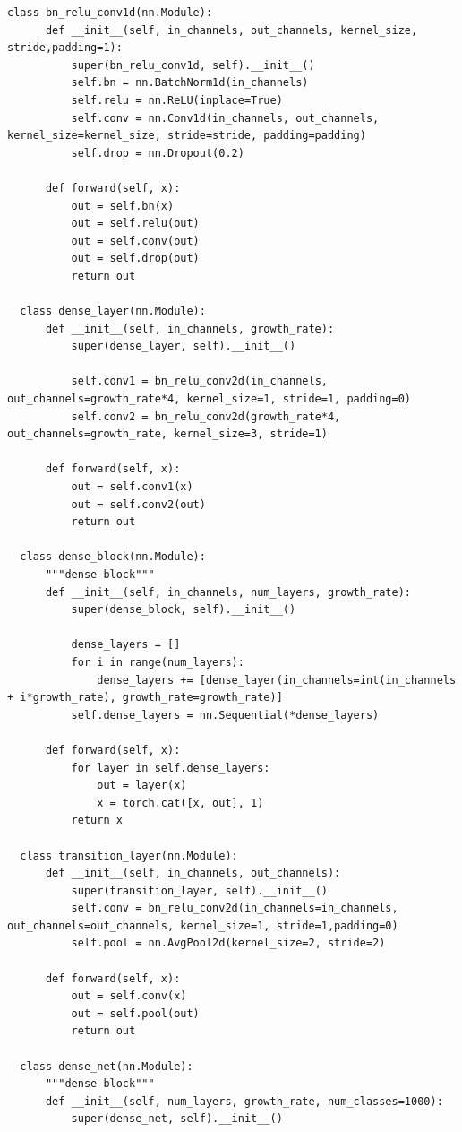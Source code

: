 \documentclass[a4paper,11pt,dvipdfmx]{jreport}
\begin{document}
\begin{lstlisting}[caption=印象判定用NN{,} DenseNetに関するソースコード, label=source]
  class bn_relu_conv1d(nn.Module):
      def __init__(self, in_channels, out_channels, kernel_size, stride,padding=1):
          super(bn_relu_conv1d, self).__init__()
          self.bn = nn.BatchNorm1d(in_channels)
          self.relu = nn.ReLU(inplace=True)
          self.conv = nn.Conv1d(in_channels, out_channels, kernel_size=kernel_size, stride=stride, padding=padding)
          self.drop = nn.Dropout(0.2)
  
      def forward(self, x):
          out = self.bn(x)
          out = self.relu(out)
          out = self.conv(out)
          out = self.drop(out)
          return out
  
  class dense_layer(nn.Module):
      def __init__(self, in_channels, growth_rate):
          super(dense_layer, self).__init__()
  
          self.conv1 = bn_relu_conv2d(in_channels, out_channels=growth_rate*4, kernel_size=1, stride=1, padding=0)
          self.conv2 = bn_relu_conv2d(growth_rate*4, out_channels=growth_rate, kernel_size=3, stride=1)
  
      def forward(self, x):
          out = self.conv1(x)
          out = self.conv2(out)
          return out
  
  class dense_block(nn.Module):
      """dense block"""
      def __init__(self, in_channels, num_layers, growth_rate):
          super(dense_block, self).__init__()
  
          dense_layers = []
          for i in range(num_layers):
              dense_layers += [dense_layer(in_channels=int(in_channels + i*growth_rate), growth_rate=growth_rate)]
          self.dense_layers = nn.Sequential(*dense_layers)
  
      def forward(self, x):
          for layer in self.dense_layers:
              out = layer(x)
              x = torch.cat([x, out], 1)
          return x
  
  class transition_layer(nn.Module):
      def __init__(self, in_channels, out_channels):
          super(transition_layer, self).__init__()
          self.conv = bn_relu_conv2d(in_channels=in_channels, out_channels=out_channels, kernel_size=1, stride=1,padding=0)
          self.pool = nn.AvgPool2d(kernel_size=2, stride=2)
  
      def forward(self, x):
          out = self.conv(x)
          out = self.pool(out)
          return out
  
  class dense_net(nn.Module):
      """dense block"""
      def __init__(self, num_layers, growth_rate, num_classes=1000):
          super(dense_net, self).__init__()
  

\end{lstlisting}
\end{document}
